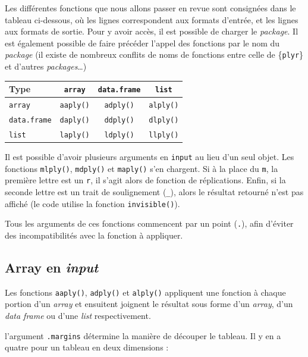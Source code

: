 \documentclass[
  11pt,
]{book}
\numberwithin{equation}{section}
\newcounter{countremarque}
\newenvironment{remarque}{%
 \refstepcounter{countremarque}
    \begin{tcolorbox}[width=\linewidth, colback=blue!3, boxrule=0.5pt,arc=0pt,title = Remarque \thecountremarque]
    }%
    {
    \end{tcolorbox}
    }
\numberwithin{countremarque}{section}
\begin{document}
Les différentes fonctions que nous allons passer en revue sont consignées dans le tableau ci-dessous, où les lignes correspondent aux formats d'entrée, et les lignes aux formats de sortie. Pour y avoir accès, il est possible de charger le \emph{package}. Il est également possible de faire précéder l'appel des fonctions par le nom du \emph{package} (il existe de nombreux conflits de noms de fonctions entre celle de \{\texttt{plyr}\} et d'autres \emph{packages}\ldots)

\begin{longtable}[]{@{}lccc@{}}
\toprule
Type & \texttt{array} & \texttt{data.frame} & \texttt{list}\tabularnewline
\midrule
\endhead
\texttt{array} & \texttt{aaply()} & \texttt{adply()} & \texttt{alply()}\tabularnewline
\texttt{data.frame} & \texttt{daply()} & \texttt{ddply()} & \texttt{dlply()}\tabularnewline
\texttt{list} & \texttt{laply()} & \texttt{ldply()} & \texttt{llply()}\tabularnewline
\bottomrule
\end{longtable}

\begin{remarque}
Il est possible d'avoir plusieurs arguments en \texttt{input} au lieu d'un seul objet. Les fonctions \texttt{mlply()}, \texttt{mdply()} et \texttt{maply()} s'en chargent. Si à la place du \texttt{m}, la première lettre est un \texttt{r}, il s'agit alors de fonction de réplications. Enfin, si la seconde lettre est un trait de soulignement (\texttt{\_}), alors le résultat retourné n'est pas affiché (le code utilise la fonction \texttt{invisible()}).
\end{remarque}

Tous les arguments de ces fonctions commencent par un point (\texttt{.}), afin d'éviter des incompatibilités avec la fonction à appliquer.

\hypertarget{boucles_vectorisation_plyr_a_ply}{%
\subsection{\texorpdfstring{Array en \emph{input}}{Array en input}}\label{boucles_vectorisation_plyr_a_ply}}

Les fonctions \texttt{aaply()}, \texttt{adply()} et \texttt{alply()} appliquent une fonction à chaque portion d'un \emph{array} et ensuitent joignent le résultat sous forme d'un \emph{array}, d'un \emph{data frame} ou d'une \emph{list} respectivement.

l'argument \texttt{.margins} détermine la manière de découper le tableau. Il y en a quatre pour un tableau en deux dimensions :
\end{document}
